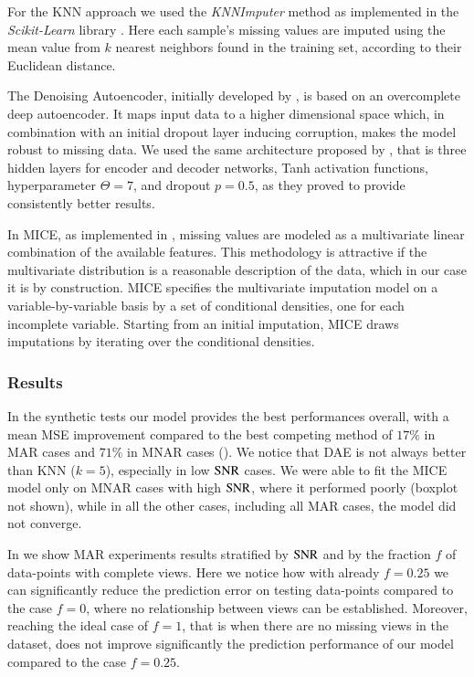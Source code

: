 For the KNN approach we used the \textit{KNNImputer} method as implemented in the \textit{Scikit-Learn} library \citep{sklearn}.
Here each sample's missing values are imputed using the mean value from $k$ nearest neighbors found in the training set, according to their Euclidean distance.

The Denoising Autoencoder, initially developed by \cite{Vincent2008}, is based on an overcomplete deep autoencoder.
It maps input data to a higher dimensional space which, in combination with an initial dropout layer inducing corruption, makes the model robust to missing data.
We used the same architecture proposed by \cite{dae}, that is three hidden layers for encoder and decoder networks, Tanh activation functions, hyperparameter $\Theta=7$, and dropout $p=0.5$, as they proved to provide consistently better results.

In MICE, as implemented in \cite{mice}, missing values are modeled as a multivariate linear combination of the available features.
This methodology is attractive if the multivariate distribution is a reasonable description of the data, which in our case it is by construction.
MICE specifies the multivariate imputation model on a variable-by-variable basis by a set of conditional densities, one for each incomplete variable.
Starting from an initial imputation, MICE draws imputations by iterating over the conditional densities.

\subsubsection{Results}


In the synthetic tests our model provides the best performances overall, with a mean MSE improvement compared to the best competing method of $17\%$ in MAR cases and $71\%$ in MNAR cases ().
We notice that DAE is not always better than KNN ($k=5$), especially in low $\operatorname{SNR}$ cases.
We were able to fit the MICE model only on MNAR cases with high $\operatorname{SNR}$, where it performed poorly (boxplot not shown), while in all the other cases, including all MAR cases, the model did not converge.

In  we show MAR experiments results stratified by $\operatorname{SNR}$ and by the fraction $f$ of data-points with complete views.
Here we notice how with already $f = 0.25$ we can significantly reduce the prediction error on testing data-points compared to the case $f=0$, where no relationship between views can be established.
Moreover, reaching the ideal case of $f=1$, that is when there are no missing views in the dataset, does not improve significantly the prediction performance of our model compared to the case $f = 0.25$.

